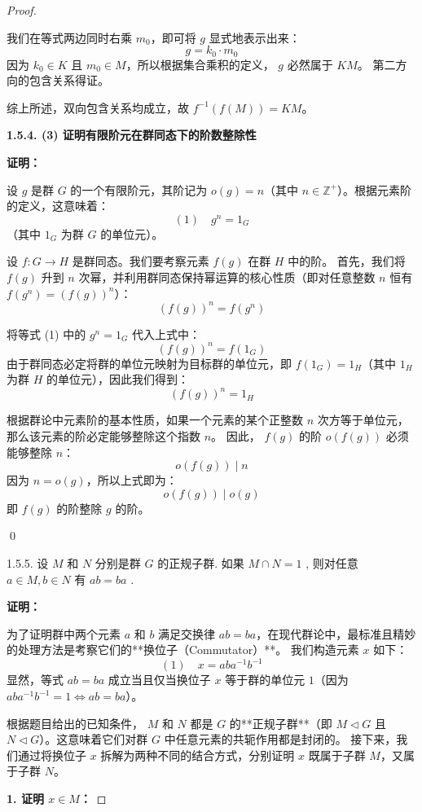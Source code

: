 \documentclass[]{article}
\begin{document}
\begin{proof}
\begin{enumerate}
	我们在等式两边同时右乘 $m_0$，即可将 $g$ 显式地表示出来：
	\[ g = k_0 \cdot m_0 \]
	因为 $k_0 \in K$ 且 $m_0 \in M$，所以根据集合乘积的定义， $g$ 必然属于 $KM$。
	第二方向的包含关系得证。
\end{enumerate}

综上所述，双向包含关系均成立，故 $f^{-1}(f(M)) = KM$。

\bigskip
\noindent \textbf{1.5.4. (3) 证明有限阶元在群同态下的阶数整除性}

\medskip
\noindent \textbf{证明：}

设 $g$ 是群 $G$ 的一个有限阶元，其阶记为 $o(g) = n$（其中 $n \in \mathbb{Z}^+$）。根据元素阶的定义，这意味着：
\[ (1) \quad g^n = 1_G \]
（其中 $1_G$ 为群 $G$ 的单位元）。

设 $f: G \longrightarrow H$ 是群同态。我们要考察元素 $f(g)$ 在群 $H$ 中的阶。
首先，我们将 $f(g)$ 升到 $n$ 次幂，并利用群同态保持幂运算的核心性质（即对任意整数 $n$ 恒有 $f(g^n) = (f(g))^n$）：
\[ (f(g))^n = f(g^n) \]

将等式 (1) 中的 $g^n = 1_G$ 代入上式中：
\[ (f(g))^n = f(1_G) \]
由于群同态必定将群的单位元映射为目标群的单位元，即 $f(1_G) = 1_H$（其中 $1_H$ 为群 $H$ 的单位元），因此我们得到：
\[ (f(g))^n = 1_H \]

根据群论中元素阶的基本性质，如果一个元素的某个正整数 $n$ 次方等于单位元，那么该元素的阶必定能够整除这个指数 $n$。
因此， $f(g)$ 的阶 $o(f(g))$ 必须能够整除 $n$：
\[ o(f(g)) \;\big|\; n \]
因为 $n = o(g)$，所以上式即为：
\[ o(f(g)) \;\big|\; o(g) \]
即 $f(g)$ 的阶整除 $g$ 的阶。

\qed

1.5.5. 设 $M$ 和 $N$ 分别是群 $G$ 的正规子群. 如果 $M \cap N = 1$ , 则对任意 $a \in M, b \in N$ 有 $ab = ba$ . 

\bigskip
\noindent \textbf{证明：} 

为了证明群中两个元素 $a$ 和 $b$ 满足交换律 $ab = ba$，在现代群论中，最标准且精妙的处理方法是考察它们的**换位子（Commutator）**。
我们构造元素 $x$ 如下：
\[ (1) \quad x = a b a^{-1} b^{-1} \]
显然，等式 $ab = ba$ 成立当且仅当换位子 $x$ 等于群的单位元 $1$（因为 $a b a^{-1} b^{-1} = 1 \iff ab = ba$）。

根据题目给出的已知条件， $M$ 和 $N$ 都是 $G$ 的**正规子群**（即 $M \triangleleft G$ 且 $N \triangleleft G$）。这意味着它们对群 $G$ 中任意元素的共轭作用都是封闭的。
接下来，我们通过将换位子 $x$ 拆解为两种不同的结合方式，分别证明 $x$ 既属于子群 $M$，又属于子群 $N$。

\bigskip
\noindent \textbf{1. 证明 $x \in M$：}


\end{proof}
\end{document}
